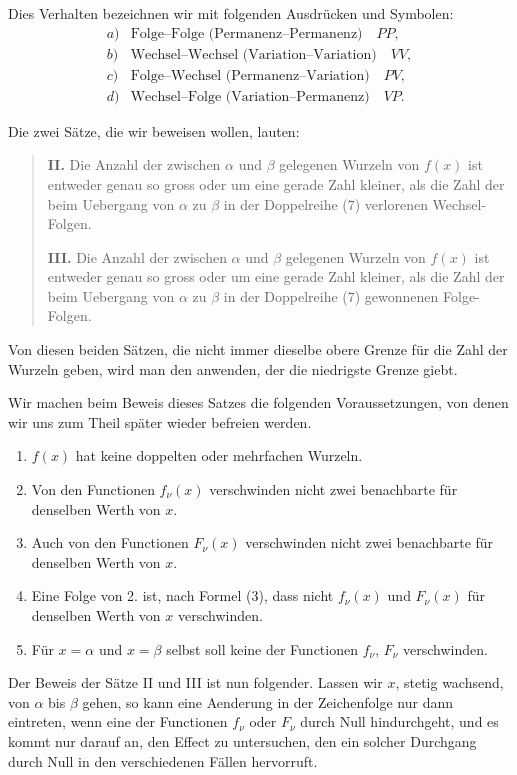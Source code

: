 \documentclass[11pt]{article}
\begin{document}
Dies Verhalten bezeichnen wir mit folgenden Ausdrücken und Symbolen:
\[
\begin{array}{ll}
a)&\text{Folge--Folge (Permanenz--Permanenz)}\quad PP,\\
b)&\text{Wechsel--Wechsel (Variation--Variation)}\quad VV,\\
c)&\text{Folge--Wechsel (Permanenz--Variation)}\quad PV,\\
d)&\text{Wechsel--Folge (Variation--Permanenz)}\quad VP.
\end{array}
\]

Die zwei Sätze, die wir beweisen wollen, lauten:

\begin{quote}
\textbf{II.} Die Anzahl der zwischen $\alpha$ und $\beta$ gelegenen Wurzeln von $f(x)$ ist entweder genau so gross oder um eine gerade Zahl kleiner, als die Zahl der beim Uebergang von $\alpha$ zu $\beta$ in der Doppelreihe (7) verlorenen Wechsel-Folgen.

\textbf{III.} Die Anzahl der zwischen $\alpha$ und $\beta$ gelegenen Wurzeln von $f(x)$ ist entweder genau so gross oder um eine gerade Zahl kleiner, als die Zahl der beim Uebergang von $\alpha$ zu $\beta$ in der Doppelreihe (7) gewonnenen Folge-Folgen.
\end{quote}

Von diesen beiden Sätzen, die nicht immer dieselbe obere Grenze für die Zahl der Wurzeln geben, wird man den anwenden, der die niedrigste Grenze giebt.

Wir machen beim Beweis dieses Satzes die folgenden Voraussetzungen, von denen wir uns zum Theil später wieder befreien werden.
\begin{enumerate}[label=\arabic*.]
\item $f(x)$ hat keine doppelten oder mehrfachen Wurzeln.
\item Von den Functionen $f_\nu(x)$ verschwinden nicht zwei benachbarte für denselben Werth von $x$.
\item Auch von den Functionen $F_\nu(x)$ verschwinden nicht zwei benachbarte für denselben Werth von $x$.
\item Eine Folge von 2. ist, nach Formel (3), dass nicht $f_\nu(x)$ und $F_\nu(x)$ für denselben Werth von $x$ verschwinden.
\item Für $x=\alpha$ und $x=\beta$ selbst soll keine der Functionen $f_\nu$, $F_\nu$ verschwinden.
\end{enumerate}

Der Beweis der Sätze II und III ist nun folgender. Lassen wir $x$, stetig wachsend, von $\alpha$ bis $\beta$ gehen, so kann eine Aenderung in der Zeichenfolge nur dann eintreten, wenn eine der Functionen $f_\nu$ oder $F_\nu$ durch Null hindurchgeht, und es kommt nur darauf an, den Effect zu untersuchen, den ein solcher Durchgang durch Null in den verschiedenen Fällen hervorruft.
\end{document}
